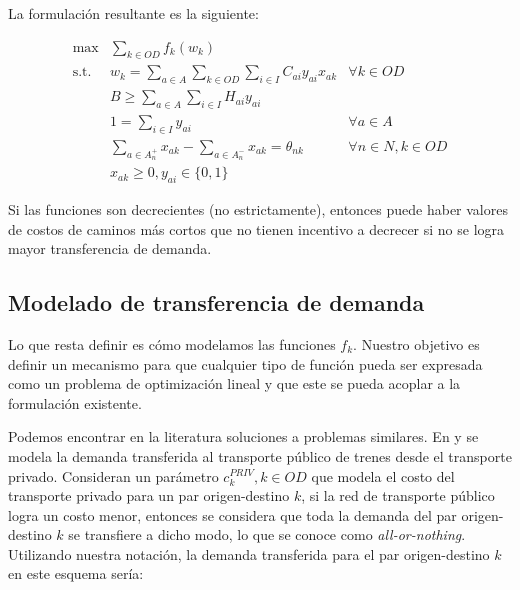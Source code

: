 \documentclass{article}
\begin{document}
  La formulación resultante es la siguiente:

  \begin{align}
    \text{max}    & \sum_{k \in OD} f_k(w_k)                                                         & \label{eq:objectivealt} \\
    \text{s.t.}\; & w_k = \sum_{a \in A} \sum_{k \in OD} \sum_{i \in I} C_{ai}y_{ai}x_{ak}           & \forall k \in OD \label{eq:shortestpathalt} \\
                  & B \geq \sum_{a \in A} \sum_{i \in I} H_{ai}y_{ai}                                & \label{eq:respectbudgetalt} \\
                  & 1 = \sum_{i \in I} y_{ai}                                                        & \forall a \in A \label{eq:alwaysoneyalt} \\
                  & \sum_{a \in A_n^+} x_{ak} - \sum_{a \in A_n^-} x_{ak} = \theta_{nk}              & \forall n \in N, k \in OD \label{eq:flowbalancealt} \\
                  & x_{ak} \geq 0, y_{ai} \in \{0,1\}                                    & \nonumber
  \end{align}

  Si las funciones son decrecientes (no estrictamente), entonces puede haber valores de costos de caminos más cortos que no tienen incentivo a decrecer si no se logra mayor transferencia de demanda.

  \subsection{Modelado de transferencia de demanda}
  \label{sect:transferfunctiondefs}

  Lo que resta definir es cómo modelamos las funciones $f_k$. Nuestro objetivo es definir un mecanismo para que cualquier tipo de función pueda ser expresada como un problema de optimización lineal y que este se pueda acoplar a la formulación existente.

  Podemos encontrar en la literatura soluciones a problemas similares. En \cite{laporte2007} y \cite{marin2007} se modela la demanda transferida al transporte público de trenes desde el transporte privado. Consideran un parámetro $c^{PRIV}_k, k \in OD$ que modela el costo del transporte privado para un par origen-destino $k$, si la red de transporte público logra un costo menor, entonces se considera que toda la demanda del par origen-destino $k$ se transfiere a dicho modo, lo que se conoce como {\it all-or-nothing}. Utilizando nuestra notación, la demanda transferida para el par origen-destino $k$ en este esquema sería:
\end{document}
